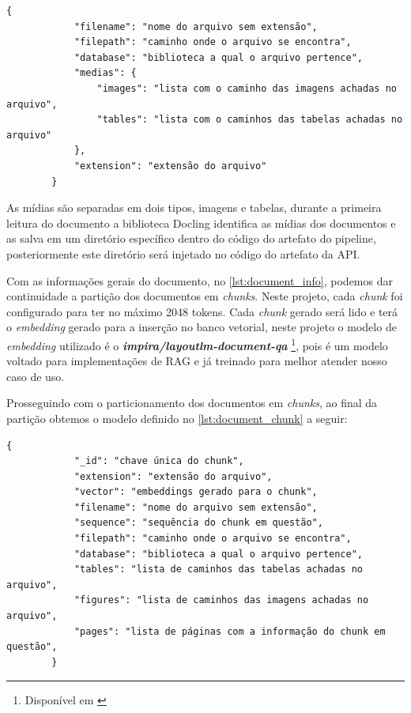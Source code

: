 \documentclass[a4paper, 12pt]{article}
\newcommand{\citeb}[1]{\bibleftbracket\cite{#1}\bibrightbracket}
\begin{document}
    \begin{lstlisting}[caption={Modelo com dados mais superficiais do documento.}, label={lst:document_info}]
        {
            "filename": "nome do arquivo sem extensão",
            "filepath": "caminho onde o arquivo se encontra",
            "database": "biblioteca a qual o arquivo pertence",
            "medias": {
                "images": "lista com o caminho das imagens achadas no arquivo",
                "tables": "lista com o caminhos das tabelas achadas no arquivo"
            },
            "extension": "extensão do arquivo"
        }
    \end{lstlisting}
    
    As mídias são separadas em dois tipos, imagens e tabelas, durante a primeira leitura do documento a biblioteca Docling identifica as mídias dos documentos e as salva em um diretório específico dentro do código do artefato do pipeline, posteriormente este diretório será injetado no código do artefato da API.

    Com as informações gerais do documento, no \autoref{lst:document_info}, podemos dar continuidade a partição dos documentos em \textit{chunks}. Neste projeto, cada \textit{chunk} foi configurado para ter no máximo 2048 tokens. Cada \textit{chunk} gerado será lido e terá o \textit{embedding} gerado para a inserção no banco vetorial, neste projeto o modelo de \textit{embedding} utilizado é o \textit{\textbf{impira/layoutlm-document-qa}} \footnote{Disponível em \citeb{impira_model}}, pois é um modelo voltado para implementações de RAG e já treinado para melhor atender nosso caso de uso.
    
    Prosseguindo com o particionamento dos documentos em \textit{chunks}, ao final da partição obtemos o modelo definido no \autoref{lst:document_chunk} a seguir:

    \begin{lstlisting}[caption={Modelo de dados para inserção no banco vetorial}, label={lst:document_chunk}]
        {
            "_id": "chave única do chunk",
            "extension": "extensão do arquivo",
            "vector": "embeddings gerado para o chunk",
            "filename": "nome do arquivo sem extensão",
            "sequence": "sequência do chunk em questão",
            "filepath": "caminho onde o arquivo se encontra",
            "database": "biblioteca a qual o arquivo pertence",
            "tables": "lista de caminhos das tabelas achadas no arquivo",
            "figures": "lista de caminhos das imagens achadas no arquivo",
            "pages": "lista de páginas com a informação do chunk em questão",
        }
    \end{lstlisting}
\end{document}
